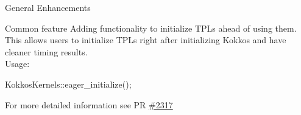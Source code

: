 
\begin{frame}[fragile]

  {\Huge General Enhancements}

  \vspace{10pt}

\end{frame}





%        



\begin{frame}[fragile]{Common feature}
  Adding functionality to initialize TPLs ahead of using them. This allows users to initialize TPLs right after initializing Kokkos and have cleaner timing results.\\
  Usage:
  \begin{center}
    {\ttfamily KokkosKernels::eager\_initialize();}
  \end{center}
  For more detailed information see PR \href{https://github.com/kokkos/kokkos-kernels/pull/2317}{\#2317}
\end{frame}

